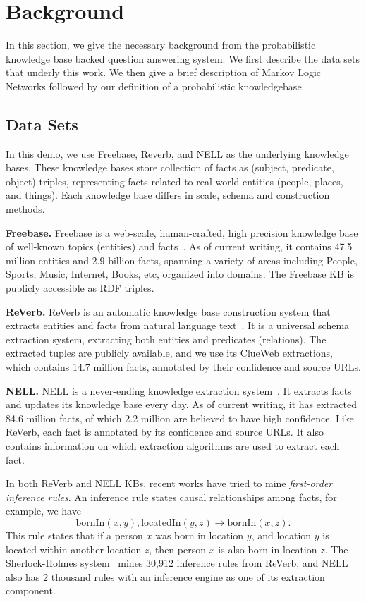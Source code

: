 
\section{Background}

In this section, we give the necessary background from the probabilistic knowledge base backed question answering system.
We first describe the data sets that underly this work.
We then give a brief description of Markov Logic Networks followed by our definition of a probabilistic knowledgebase.

\subsection{Data Sets}
\label{sec:probqa-dataset}

In this demo, we use Freebase, Reverb, and NELL as the underlying knowledge bases.
These knowledge bases store collection of facts as (subject, predicate, object) triples,
representing facts related to real-world entities (people, places, and things).
Each knowledge base differs in scale, schema and construction methods.

\noindent\textbf{Freebase.} Freebase is a web-scale, human-crafted, high precision knowledge base of
well-known topics (entities) and facts~\cite{bollacker2008freebase}.
As of current writing, it contains 47.5 million entities
and 2.9 billion facts, spanning a variety of areas including People, Sports, Music, Internet,
Books, etc, organized into domains. The Freebase KB is publicly accessible as RDF triples.

\noindent\textbf{ReVerb.} ReVerb is an automatic knowledge base construction system
that extracts entities and facts from natural language text~\cite{fader2011identifying}.
It is a universal schema extraction system, extracting both entities and predicates (relations).
The extracted tuples are publicly available, and we use
its ClueWeb extractions, which contains 14.7 million facts, annotated by their confidence
and source URLs.

\noindent\textbf{NELL.} NELL is a never-ending knowledge extraction system~\cite{mitchell2015never}.
It extracts facts and updates its knowledge base every day.
As of current writing, it has extracted 84.6 million facts, of
which 2.2 million are believed to have high confidence.
Like ReVerb, each fact is annotated by its confidence and source URLs.
It also contains information on which extraction
algorithms are used to extract each fact.

In both ReVerb and NELL KBs, recent works have tried to mine \emph{first-order inference rules}.
An inference rule states causal relationships among facts, for example, we have
\[
\text{bornIn}(x, y), \text{locatedIn}(y, z) \rightarrow \text{bornIn}(x, z).
\]
This rule states that if a person \(x\) was born in location \(y\), and location \(y\)
is located within another location \(z\), then person \(x\) is also born in location \(z\).
The Sherlock-Holmes system~\cite{schoenmackers2010learning} mines 30,912 inference rules from ReVerb, and NELL also
has 2 thousand rules with an inference engine as one of its extraction component.


